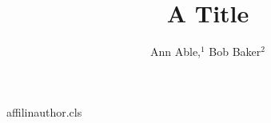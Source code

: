\begin{filecontents*}[overwrite]{affilinauthor.cls}
\def\YES{yes}
\def\chk@key{no}
\def\affilfont{\small\leftskip2em\rightskip0pt plus1fil}
\def\affil#1{\par\ifx\chk@key\YES\else\vskip6\p@\fi{\reset@font\affilfont#1\par}\def\chk@key{yes}}
\def\@maketitle{\newpage{\Large\bfseries\@title\par}\vskip1em\noindent{\bfseries\@author\par}\vskip1em}
\end{filecontents*}
\documentclass{affilinauthor}

\title{A Title}
\author{Ann Able,$^1$ Bob Baker$^2$
}
\maketitle
Body.

